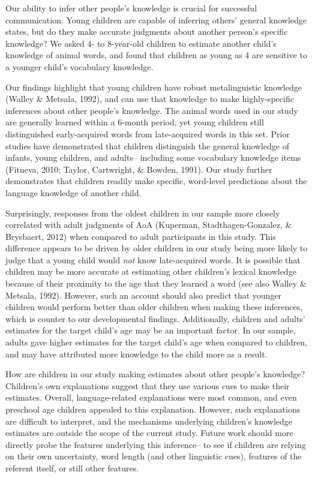 \documentclass[10pt, letterpaper]{article}
\begin{document}
Our ability to infer other people's knowledge is crucial for successful
communication. Young children are capable of inferring others' general
knowledge states, but do they make accurate judgments about another
person's specific knowledge? We asked 4- to 8-year-old children to
estimate another child's knowledge of animal words, and found that
children as young as 4 are sensitive to a younger child's vocabulary
knowledge.

Our findings highlight that young children have robust metalinguistic
knowledge (Walley \& Metsala, 1992), and can use that knowledge to make
highly-specific inferences about other people's knowledge. The animal
words used in our study are generally learned within a 6-month period,
yet young children still distinguished early-acquired words from
late-acquired words in this set. Prior studies have demonstrated that
children distinguish the general knowledge of infants, young children,
and adults-- including some vocabulary knowledge items (Fitneva, 2010;
Taylor, Cartwright, \& Bowden, 1991). Our study further demonstrates
that children readily make specific, word-level predictions about the
language knowledge of another child.

Surprisingly, responses from the oldest children in our sample more
closely correlated with adult judgments of AoA (Kuperman,
Stadthagen-Gonzalez, \& Brysbaert, 2012) when compared to adult
participants in this study. This difference appears to be driven by
older children in our study being more likely to judge that a young
child would \emph{not} know late-acquired words. It is possible that
children may be more accurate at estimating other children's lexical
knowledge because of their proximity to the age that they learned a word
(see also Walley \& Metsala, 1992). However, such an account should also
predict that younger children would perform better than older children
when making these inferences, which is counter to our developmental
findings. Additionally, children and adults' estimates for the target
child's age may be an important factor. In our sample, adults gave
higher estimates for the target child's age when compared to children,
and may have attributed more knowledge to the child more as a result.

How are children in our study making estimates about other people's
knowledge? Children's own explanations suggest that they use various
cues to make their estimates. Overall, language-related explanations
were most common, and even preschool age children appealed to this
explanation. However, such explanations are difficult to interpret, and
the mechanisms underlying children's knowledge estimates are outside the
scope of the current study. Future work should more directly probe the
features underlying this inference-- to see if children are relying on
their own uncertainty, word length (and other linguistic cues), features
of the referent itself, or still other features.
\end{document}
